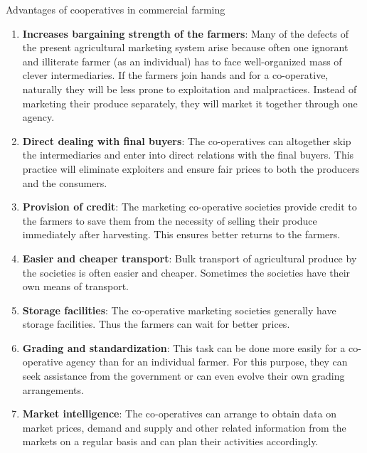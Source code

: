 \documentclass[12pt,ignorenonframetext,aspectratio=169]{beamer}
\providecommand{\tightlist}{%
  \setlength{\itemsep}{0pt}\setlength{\parskip}{0pt}}
\begin{document}
\begin{frame}{Advantages of cooperatives in commercial farming}
\protect\hypertarget{advantages-of-cooperatives-in-commercial-farming}{}
\footnotesize

\begin{enumerate}
\item
  \textbf{Increases bargaining strength of the farmers}: Many of the
  defects of the present agricultural marketing system arise because
  often one ignorant and illiterate farmer (as an individual) has to
  face well-organized mass of clever intermediaries. If the farmers join
  hands and for a co-operative, naturally they will be less prone to
  exploitation and malpractices. Instead of marketing their produce
  separately, they will market it together through one agency.
\item
  \textbf{Direct dealing with final buyers}: The co-operatives can
  altogether skip the intermediaries and enter into direct relations
  with the final buyers. This practice will eliminate exploiters and
  ensure fair prices to both the producers and the consumers.
\item
  \textbf{Provision of credit}: The marketing co-operative societies
  provide credit to the farmers to save them from the necessity of
  selling their produce immediately after harvesting. This ensures
  better returns to the farmers.
\end{enumerate}
\end{frame}

\begin{frame}{}
\protect\hypertarget{section-4}{}
\footnotesize

\begin{enumerate}
\setcounter{enumi}{3}
\tightlist
\item
  \textbf{Easier and cheaper transport}: Bulk transport of agricultural
  produce by the societies is often easier and cheaper. Sometimes the
  societies have their own means of transport.
\item
  \textbf{Storage facilities}: The co-operative marketing societies
  generally have storage facilities. Thus the farmers can wait for
  better prices.
\item
  \textbf{Grading and standardization}: This task can be done more
  easily for a co-operative agency than for an individual farmer. For
  this purpose, they can seek assistance from the government or can even
  evolve their own grading arrangements.
\item
  \textbf{Market intelligence}: The co-operatives can arrange to obtain
  data on market prices, demand and supply and other related information
  from the markets on a regular basis and can plan their activities
  accordingly.
\end{enumerate}
\end{frame}
\end{document}
